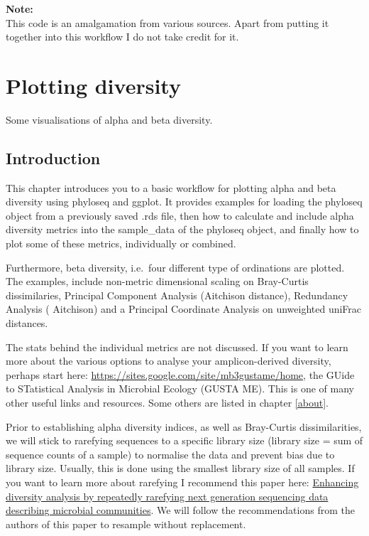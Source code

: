 \documentclass[
]{book}
\begin{document}
\textbf{Note:}\\
This code is an amalgamation from various sources. Apart from putting it together into this workflow I do not take credit for it.

\hypertarget{plotting-diversity}{%
\chapter{Plotting diversity}\label{plotting-diversity}}

Some visualisations of alpha and beta diversity.

\hypertarget{introduction-3}{%
\section{Introduction}\label{introduction-3}}

This chapter introduces you to a basic workflow for plotting alpha and beta diversity using phyloseq and ggplot. It provides examples for loading the phyloseq object from a previously saved .rds file, then how to calculate and include alpha diversity metrics into the sample\_data of the phyloseq object, and finally how to plot some of these metrics, individually or combined.

Furthermore, beta diversity, i.e.~four different type of ordinations are plotted. The examples, include non-metric dimensional scaling on Bray-Curtis dissimilaries, Principal Component Analysis (Aitchison distance), Redundancy Analysis ( Aitchison) and a Principal Coordinate Analysis on unweighted uniFrac distances.

The stats behind the individual metrics are not discussed. If you want to learn more about the various options to analyse your amplicon-derived diversity, perhaps start here: \url{https://sites.google.com/site/mb3gustame/home}, the GUide to STatistical Analysis in Microbial Ecology (GUSTA ME). This is one of many other useful links and resources. Some others are listed in chapter \ref{about}.

Prior to establishing alpha diversity indices, as well as Bray-Curtis dissimilarities, we will stick to rarefying sequences to a specific library size (library size = sum of sequence counts of a sample) to normalise the data and prevent bias due to library size. Usually, this is done using the smallest library size of all samples. If you want to learn more about rarefying I recommend this paper here: \href{https://www.nature.com/articles/s41598-021-01636-1}{Enhancing diversity analysis by repeatedly rarefying next generation sequencing data describing microbial communities}. We will follow the recommendations from the authors of this paper to resample without replacement.
\end{document}
